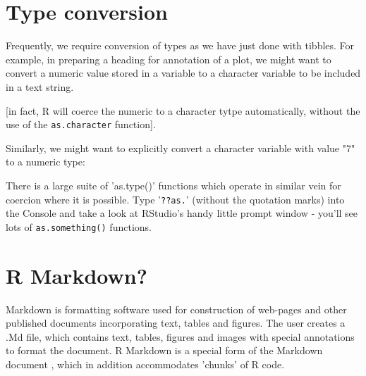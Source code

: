 \documentclass[titlepage]{book}\usepackage{knitr}
\begin{document}
\section{Type conversion}
Frequently, we require conversion of types as we have just done with tibbles. For example, in preparing a heading for annotation of a plot, we might want to convert a numeric value stored in a variable to a character variable to be included in a text string.  
\begin{knitrout}
\color{fgcolor}\begin{kframe}
\begin{alltt}
 \hlkwb{<-} 
 \hlkwb{<-} \hlstd{(}\hlstd{,}   \hlstd{=} \hlstd{)}
\end{alltt}
\end{kframe}
\end{knitrout}
[in fact, R will coerce the numeric to a character tytpe automatically, without the use of the \texttt{as.character} function]. 

Similarly, we might want to explicitly convert a character variable with value "7" to a numeric type:
\begin{knitrout}
\color{fgcolor}\begin{kframe}
\begin{alltt}
 \hlkwb{<-} 
 \hlopt{+}                
 \hlopt{+} 
\end{alltt}
\end{kframe}
\end{knitrout}
There is a large suite of 'as.type()' functions which operate in similar vein for coercion where it is possible.  Type '\texttt{??as.}' (without the quotation marks) into the Console and take a look at RStudio's handy little prompt window - you'll see lots of \texttt{as.something()} functions.


\section{ R Markdown?}

Markdown is formatting software used for construction of web-pages and other published documents incorporating text, tables and figures. The user creates a .Md file, which contains text, tables, figures and images with special annotations to format the document.  R Markdown is a special form of the Markdown document , which in addition accommodates 'chunks' of R code.
\end{document}
